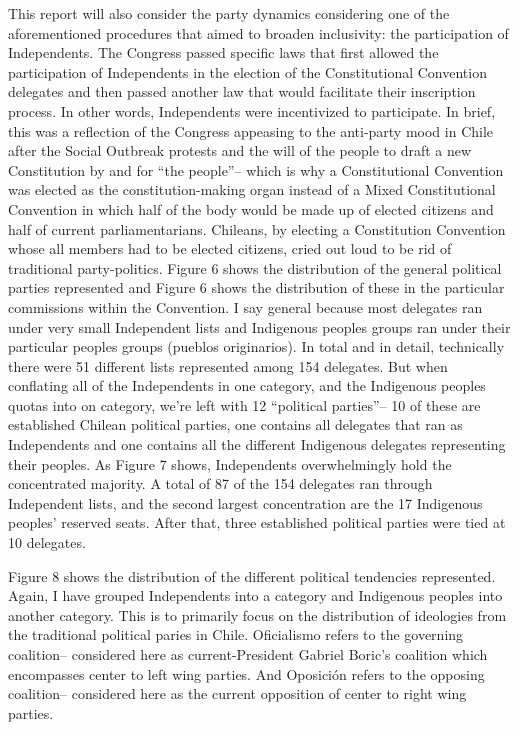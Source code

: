 \documentclass[
  man]{apa6}
\begin{document}
This report will also consider the party dynamics considering one of the aforementioned procedures that aimed to broaden inclusivity: the participation of Independents. The Congress passed specific laws that first allowed the participation of Independents in the election of the Constitutional Convention delegates and then passed another law that would facilitate their inscription process. In other words, Independents were incentivized to participate. In brief, this was a reflection of the Congress appeasing to the anti-party mood in Chile after the Social Outbreak protests and the will of the people to draft a new Constitution by and for ``the people''-- which is why a Constitutional Convention was elected as the constitution-making organ instead of a Mixed Constitutional Convention in which half of the body would be made up of elected citizens and half of current parliamentarians. Chileans, by electing a Constitution Convention whose all members had to be elected citizens, cried out loud to be rid of traditional party-politics.
Figure 6 shows the distribution of the general political parties represented and Figure 6 shows the distribution of these in the particular commissions within the Convention. I say general because most delegates ran under very small Independent lists and Indigenous peoples groups ran under their particular peoples groups (pueblos originarios). In total and in detail, technically there were 51 different lists represented among 154 delegates. But when conflating all of the Independents in one category, and the Indigenous peoples quotas into on category, we're left with 12 ``political parties''-- 10 of these are established Chilean political parties, one contains all delegates that ran as Independents and one contains all the different Indigenous delegates representing their peoples. As Figure 7 shows, Independents overwhelmingly hold the concentrated majority. A total of 87 of the 154 delegates ran through Independent lists, and the second largest concentration are the 17 Indigenous peoples' reserved seats. After that, three established political parties were tied at 10 delegates.

Figure 8 shows the distribution of the different political tendencies represented. Again, I have grouped Independents into a category and Indigenous peoples into another category. This is to primarily focus on the distribution of ideologies from the traditional political paries in Chile. Oficialismo refers to the governing coalition-- considered here as current-President Gabriel Boric's coalition which encompasses center to left wing parties. And Oposición refers to the opposing coalition-- considered here as the current opposition of center to right wing parties.
\end{document}
